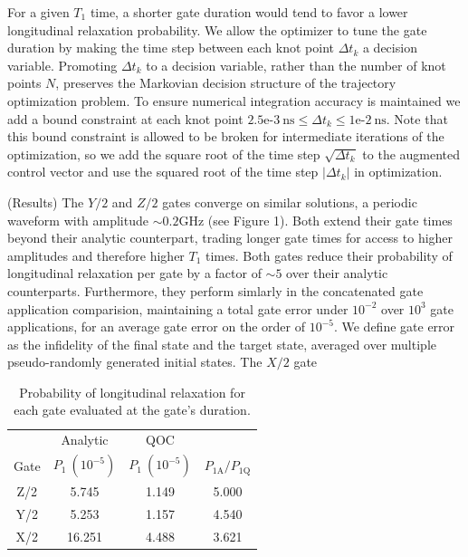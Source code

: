\documentclass[
  amsfonts,
  amsmath,
  tbtags,
  amssymb,
  aps,
  nobibnotes,
  twocolumn,
  superscriptaddress,
]{revtex4-2}
\begin{document}
For a given $T_{1}$ time, a shorter gate duration would tend to
favor a lower longitudinal relaxation probability.
We allow the optimizer to tune the gate duration by
making the time step between each knot point $\Delta t_{k}$
a decision variable.
Promoting $\Delta t_{k}$ to a decision variable, rather
than the number of knot points $N$, preserves the
Markovian decision structure of the trajectory
optimization problem. To ensure numerical
integration accuracy is maintained we add a bound
constraint at each knot point
$2.5\textrm{e-}3 \ \textrm{ns} \le
\Delta t_{k} \le 1\textrm{e-}2 \ \textrm{ns}$.
Note that this bound constraint is allowed to be
broken for intermediate iterations of the optimization,
so we add the square root of the time step $\sqrt{\Delta t_{k}}$
to the augmented control vector and use the squared root
of the time step $\lvert \Delta t_{k} \rvert$ in optimization.

(Results) The $Y/2$ and $Z/2$ gates converge on similar solutions, a periodic
waveform with amplitude $\sim 0.2 \textrm{GHz}$ (see Figure 1). Both extend their gate times
beyond their analytic counterpart, trading longer gate times for access
to higher amplitudes and therefore higher $T_{1}$ times. Both gates reduce
their probability of longitudinal relaxation per gate by a factor of $\sim 5$ over
their analytic counterparts. Furthermore, they perform simlarly in
the concatenated gate application comparision, maintaining a total gate error under $10^{-2}$
over $10^{3}$ gate applications, for an average gate error on the order of $10^{-5}$.
We define gate error as the infidelity of the final state and the target state,
averaged over multiple pseudo-randomly
generated initial states. The $X/2$ gate 

\begin{table}[ht]
  \begin{tabular}{c | c | c | c}
    & Analytic  & QOC &\\
    Gate & $P_{1}\ (10^{-5})$ & $P_{1}\ (10^{-5})$ & $P_{1\textrm{A}} / P_{1\textrm{Q}}$\\
    \hline
    Z/2 & 5.745 & 1.149 & 5.000\\
    Y/2 & 5.253 & 1.157 & 4.540\\
    X/2 & 16.251 & 4.488 & 3.621\\
  \end{tabular}
  \caption{Probability of longitudinal relaxation for each gate
    evaluated at the gate's duration.}
\end{table}
\end{document}
